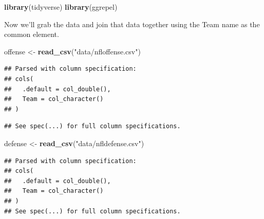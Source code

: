 \documentclass[]{book}
\newenvironment{Shaded}{\begin{snugshade}}{\end{snugshade}}
\newcommand{\KeywordTok}[1]{\textcolor[rgb]{0.13,0.29,0.53}{\textbf{#1}}}
\newcommand{\DataTypeTok}[1]{\textcolor[rgb]{0.13,0.29,0.53}{#1}}
\newcommand{\StringTok}[1]{\textcolor[rgb]{0.31,0.60,0.02}{#1}}
\newcommand{\OperatorTok}[1]{\textcolor[rgb]{0.81,0.36,0.00}{\textbf{#1}}}
\newcommand{\NormalTok}[1]{#1}
\begin{document}
\begin{Shaded}
\begin{Highlighting}[]
\KeywordTok{library}\NormalTok{(tidyverse)}
\KeywordTok{library}\NormalTok{(ggrepel)}
\end{Highlighting}
\end{Shaded}

Now we'll grab the data and join that data together using the Team name
as the common element.

\begin{Shaded}
\begin{Highlighting}[]
\NormalTok{offense <-}\StringTok{ }\KeywordTok{read_csv}\NormalTok{(}\StringTok{"data/nfloffense.csv"}\NormalTok{)}
\end{Highlighting}
\end{Shaded}

\begin{verbatim}
## Parsed with column specification:
## cols(
##   .default = col_double(),
##   Team = col_character()
## )
\end{verbatim}

\begin{verbatim}
## See spec(...) for full column specifications.
\end{verbatim}

\begin{Shaded}
\begin{Highlighting}[]
\NormalTok{defense <-}\StringTok{ }\KeywordTok{read_csv}\NormalTok{(}\StringTok{"data/nfldefense.csv"}\NormalTok{)}
\end{Highlighting}
\end{Shaded}

\begin{verbatim}
## Parsed with column specification:
## cols(
##   .default = col_double(),
##   Team = col_character()
## )
## See spec(...) for full column specifications.
\end{verbatim}

\begin{Shaded}
\end{Shaded}
\end{document}
